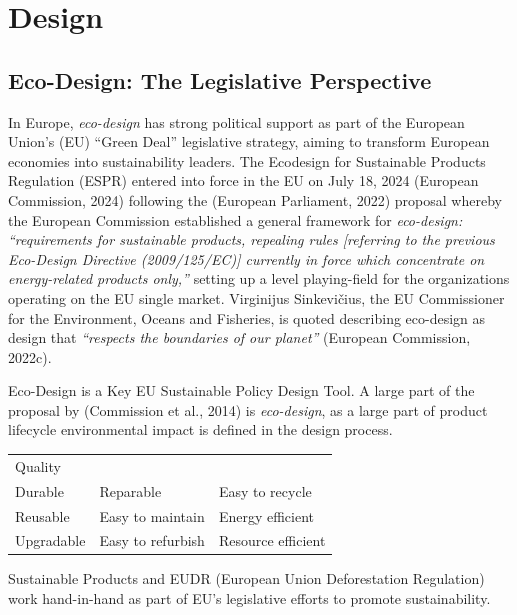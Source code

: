 \documentclass[
  letterpaper,
  DIV=11,
  numbers=noendperiod]{scrartcl}
\begin{document}
\newpage

\section{Design}\label{design}

\subsection{Eco-Design: The Legislative
Perspective}\label{eco-design-the-legislative-perspective}

In Europe, \emph{eco-design} has strong political support as part of the
European Union's (EU) ``Green Deal'' legislative strategy, aiming to
transform European economies into sustainability leaders. The Ecodesign
for Sustainable Products Regulation (ESPR) entered into force in the EU
on July 18, 2024 (European Commission, 2024) following the (European
Parliament, 2022) proposal whereby the European Commission established a
general framework for \emph{eco-design: ``requirements for sustainable
products, repealing rules {[}referring to the previous Eco-Design
Directive (2009/125/EC){]} currently in force which concentrate on
energy-related products only,''} setting up a level playing-field for
the organizations operating on the EU single market. Virginijus
Sinkevičius, the EU Commissioner for the Environment, Oceans and
Fisheries, is quoted describing eco-design as design that
\emph{``respects the boundaries of our planet''} (European Commission,
2022c).

Eco-Design is a Key EU Sustainable Policy Design Tool. A large part of
the proposal by (Commission et al., 2014) is \emph{eco-design}, as a
large part of product lifecycle environmental impact is defined in the
design process.

\begin{longtable}[]{@{}lll@{}}
\toprule\noalign{}
\endhead
\bottomrule\noalign{}
\endlastfoot
Quality & & \\
Durable & Reparable & Easy to recycle \\
Reusable & Easy to maintain & Energy efficient \\
Upgradable & Easy to refurbish & Resource efficient \\
\end{longtable}

Sustainable Products and EUDR (European Union Deforestation Regulation)
work hand-in-hand as part of EU's legislative efforts to promote
sustainability.
\end{document}
